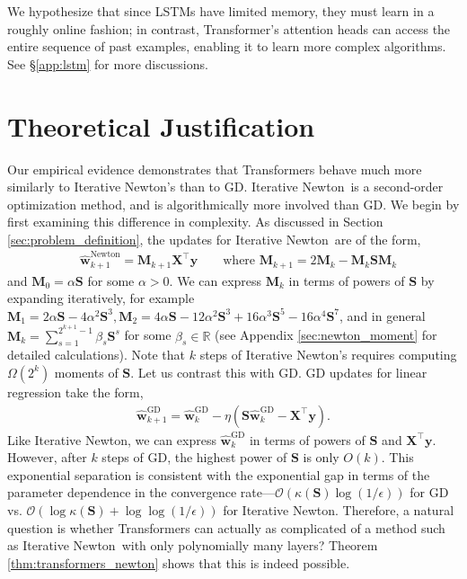 \documentclass[11pt]{article}
\theoremstyle{plain}
\theoremstyle{definition}
\theoremstyle{remark}
\renewcommand{\^}[1]{^{(#1)}}
\newcommand{\bX}{\boldsymbol{X}}
\newcommand{\bM}{\boldsymbol{M}}
\newcommand{\by}{\boldsymbol{y}}
\newcommand{\bS}{\boldsymbol{S}}
\newcommand{\bw}{\boldsymbol{w}}
\newcommand{\newton}{Iterative Newton}
\newcommand{\R}{\mathbb{R}}
\begin{document}
We hypothesize that since LSTMs have limited memory, they must learn in a roughly online fashion;
in contrast, Transformer's attention heads can access the entire sequence of past examples, enabling it to learn more complex algorithms. See \S \ref{app:lstm} for more discussions.

\vspace{-1mm}
\section{Theoretical Justification}
\label{sec:mechanism}
\vspace{-1mm}

Our empirical evidence demonstrates that Transformers behave much more similarly to \newton's than to GD. \newton\ is a second-order optimization method, and is algorithmically more involved than GD. We begin by first examining this difference in complexity. As discussed in Section \ref{sec:problem_definition}, the updates for \newton\ are of the form,
\begin{align}
   &\hat{\bw}^\mathrm{Newton}_{k+1} =  \bM_{k+1}  \bX^\top \by  \qquad \text{where } \bM_{k+1} = 2 \bM_{k} - \bM_k \bS \bM_k 
\end{align}
and $\bM_{0}=\alpha \bS $ for some $\alpha>0.$ We can express $\bM_k$ in terms of powers of $\bS$ by expanding iteratively, for example $\bM_{1}=2 \alpha \bS - 4 \alpha^2 \bS^3, \bM_{2}= 4 \alpha \bS - 12 \alpha^2 \bS^3  + 16 \alpha^3 \bS^5 - 16\alpha^4 \bS^7$, and in general $\bM_k = \sum_{s=1}^{2^{k+1} - 1} \beta_s \bS^s$ for some $\beta_s\in \R$ (see Appendix \ref{sec:newton_moment} for detailed calculations). Note that $k$ steps of \newton's requires computing $\Omega(2^k)$ moments of $\bS$. Let us contrast this with GD. GD updates for linear regression take the  form,
\begin{align}
\hat{\bw}^\mathrm{GD}_{k+1} = \hat{\bw}^\mathrm{GD}_{k} - \eta (\bS \hat{\bw}^\mathrm{GD}_{k} -\bX^\top \by).
\end{align}
Like \newton, we can express $\hat{\bw}^\mathrm{GD}_{k}$  in terms of powers of $\bS$ and $\bX^\top \by$. However, after $k$ steps of GD, the highest power of $\bS$ is only $O(k)$. This exponential separation is consistent with the exponential gap in terms of the parameter dependence in the convergence rate---$\mathcal O\left(\kappa(\bS) \log(1/\epsilon)\right)$ for GD vs. $\mathcal O(\log \kappa(\bS) + \log \log (1/\epsilon))$ for \newton. Therefore, a natural question is whether Transformers can actually as complicated of a method such as \newton\ with only polynomially many layers? Theorem \ref{thm:transformers_newton} shows that this is indeed possible. 
\end{document}

